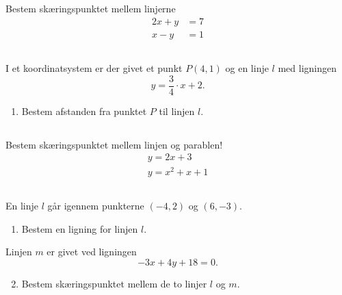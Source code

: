 \documentclass[10pt,a4paper,table]{article}
\begin{document}
\thispagestyle{plain}

\section{}
\subsection{}
Bestem skæringspunktet mellem linjerne
\begin{align*}
2x + y &= 7 \\
x - y &= 1
\end{align*}

\subsection{}
I et koordinatsystem er der givet et punkt $P(4,1)$ og en linje $l$ med ligningen
\[
    y = \frac{3}{4} \cdot x + 2 .
\]

\begin{enumerate}
    \item Bestem afstanden fra punktet $P$ til linjen $l$.
\end{enumerate}

\subsection{}
Bestem skæringspunktet mellem linjen og parablen!
\begin{align*}
y = 2x + 3 \\
y = x^2 + x + 1
\end{align*}

\subsection{}
En linje $l$ går igennem punkterne $(-4,2)$ og $(6,-3)$.

\begin{enumerate}
    \item Bestem en ligning for linjen $l$.
\end{enumerate}

Linjen $m$ er givet ved ligningen
\[
    -3x + 4y + 18 = 0 .
\]

\begin{enumerate}
    \setcounter{enumi}{1}
    \item Bestem skæringspunktet mellem de to linjer $l$ og $m$.
\end{enumerate}

\clearpage
\end{document}
